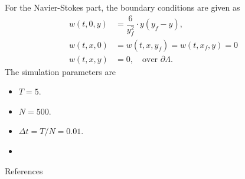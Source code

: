 \documentclass{beamer}
\theoremstyle{definition}
\theoremstyle{remark}
\theoremstyle{example}
\newif\ifinsection
\newif\ifinsubsection
\newcommand {\aframe}[1] {
  \begin{frame}
    \ifinsection\frametitle{\secname}\fi
    \ifinsubsection\framesubtitle{\subsecname}\fi
  #1
  \end{frame}
}
\begin{document}
\aframe{
  For the Navier-Stokes part, the boundary conditions are given as
  \begin{align*}
    w(t, 0, y)& = \dfrac{6}{y_f^2}\cdot y(y_f-y),\\
    w(t, x, 0)& = w(t, x, y_f) = w(t, x_f, y) = 0\\
    w(t, x, y)& = 0,\quad \text{over }\partial\Lambda.
  \end{align*}
  The simulation parameters are
  \begin{itemize}
    \item $T=5$.
    \item $N=500$.
    \item $\Delta t=T/N=0.01$.
    \item 
  \end{itemize}
}

\begin{frame}[allowframebreaks]{References}
  \printbibliography
\end{frame}

\begin{frame}
  \begin{minipage}[t][.8\textheight]{\textwidth}
    \vfill
    \begin{center}
      \begin{multicols}{2}
         \\
         \\

        \columnbreak
         \\
      \end{multicols}
    \end{center}
  \end{minipage}
\end{frame}
\end{document}
